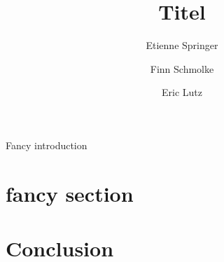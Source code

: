 \documentclass[aps,prl,floatfix,twocolumn,amsfonts,amssymb,amsmath]{revtex4-1}
\begin{document}
\title{Titel}
\author{Etienne Springer}
\author{Finn Schmolke}
\author{Eric Lutz}
\maketitle
Fancy introduction

\section{fancy section}

\section{Conclusion}


\end{document}
